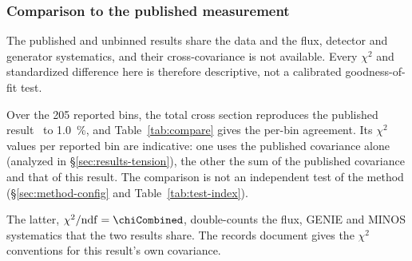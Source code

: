 \subsubsection{Comparison to the published measurement}
\label{sec:results-compare}
The published and unbinned results share the data and the flux, detector and generator systematics, and their cross-covariance is not available. Every $\chi^{2}$ and standardized difference here is therefore descriptive, not a calibrated goodness-of-fit test.

Over the 205 reported bins, the total cross section reproduces the published result~\cite{MINERvA:2021owq} to \SI{1.0}{\percent}, and Table~\ref{tab:compare} gives the per-bin agreement. Its $\chi^{2}$ values per reported bin are indicative: one uses the published covariance alone (analyzed in \S\ref{sec:results-tension}), the other the sum of the published covariance and that of this result. The comparison is not an independent test of the method (\S\ref{sec:method-config} and Table~\ref{tab:test-index}).

The latter, $\chi^{2}/\mathrm{ndf}=\chiCombined$, double-counts the flux, GENIE and MINOS systematics that the two results share. The records document gives the $\chi^{2}$ conventions for this result's own covariance.

